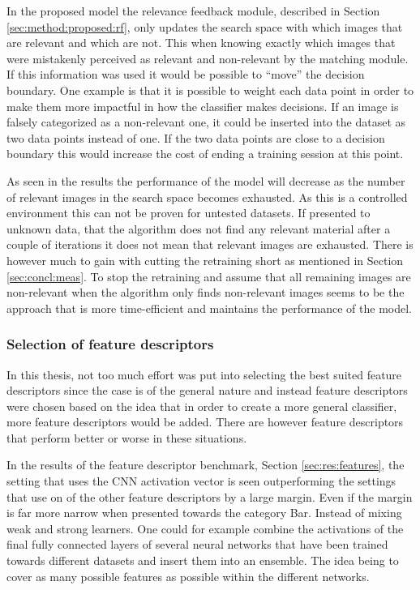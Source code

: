 In the proposed model the relevance feedback module, described in Section \ref{sec:method:proposed:rf}, only updates the search space with which images that are relevant and which are not. This when knowing exactly which images that were mistakenly perceived as relevant and non-relevant by the matching module. If this information was used it would be possible to ``move'' the decision boundary. 
One example is that it is possible to weight each data point in order to make them more impactful in how the classifier makes decisions. If an image is falsely categorized as a non-relevant one, it could be inserted into the dataset as two data points instead of one. If the two data points are close to a decision boundary this would increase the cost of ending a training session at this point. 

As seen in the results the performance of the model will decrease as the number of relevant images in the search space becomes exhausted. As this is a controlled environment this can not be proven for untested datasets. If presented to unknown data, that the algorithm does not find any relevant material after a couple of iterations it does not mean that relevant images are exhausted. There is however much to gain with cutting the retraining short as mentioned in Section \ref{sec:concl:meas}. To stop the retraining and assume that all remaining images are non-relevant when the algorithm only finds non-relevant images seems to be the approach that is more time-efficient and maintains the performance of the model.

\subsubsection{Selection of feature descriptors}
\label{sec:conc:future:model:feat}
In this thesis, not too much effort was put into selecting the best suited feature descriptors since the case is of the general nature and instead feature descriptors were chosen based on the idea that in order to create a more general classifier, more feature descriptors would be added. There are however feature descriptors that perform better or worse in these situations.

In the results of the feature descriptor benchmark, Section \ref{sec:res:features}, the setting that uses the CNN activation vector is seen outperforming the settings that use on of the other feature descriptors by a large margin. Even if the margin is far more narrow when presented towards the category Bar. Instead of mixing weak and strong learners. One could for example combine the activations of the final fully connected layers of several neural networks that have been trained towards different datasets and insert them into an ensemble. The idea being to cover as many possible features as possible within the different networks. 

